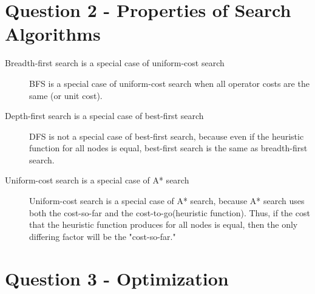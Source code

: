 \documentclass{article}
\begin{document}
\section{Question 2 - Properties of Search Algorithms}
\begin{description}
    \item[Breadth-first search is a special case of uniform-cost search]
        BFS is a special case of uniform-cost search when all operator
        costs are the same (or unit cost).
    \item[Depth-first search is a special case of best-first search]
        DFS is not a special case of best-first search, because even
        if the heuristic function for all nodes is equal, best-first search
        is the same as breadth-first search.
    \item[Uniform-cost search is a special case of A* search]
        Uniform-cost search is a special case of A* search, because
        A* search uses both the cost-so-far and the cost-to-go(heuristic function).
        Thus, if the cost that the heuristic function produces for all nodes
        is equal, then the only differing factor will be the "cost-so-far."
\end{description}

\section{Question 3 - Optimization}
\end{document}
